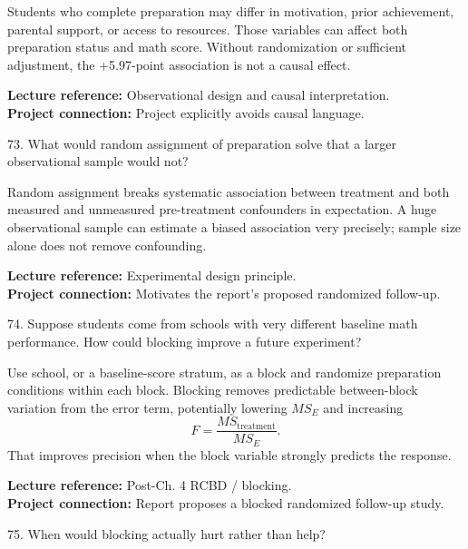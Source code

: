 \documentclass[10.5pt,a4paper]{article}
\newcommand{\chapref}[1]{\textbf{Lecture reference:} #1}
\newcommand{\projectref}[1]{\textbf{Project connection:} #1}
\begin{document}
\begin{answerbox}Students who complete preparation may differ in motivation, prior achievement, parental support, or access to resources. Those variables can affect both preparation status and math score. Without randomization or sufficient adjustment, the +5.97-point association is not a causal effect.\end{answerbox}
\begin{refbox}\chapref{Observational design and causal interpretation.}\\\projectref{Project explicitly avoids causal language.}\end{refbox}
\begin{qbox}{73. What would random assignment of preparation solve that a larger observational sample would not?}
\end{qbox}
\begin{answerbox}Random assignment breaks systematic association between treatment and both measured and unmeasured pre-treatment confounders in expectation. A huge observational sample can estimate a biased association very precisely; sample size alone does not remove confounding.\end{answerbox}
\begin{refbox}\chapref{Experimental design principle.}\\\projectref{Motivates the report's proposed randomized follow-up.}\end{refbox}
\begin{qbox}{74. Suppose students come from schools with very different baseline math performance. How could blocking improve a future experiment?}
\end{qbox}
\begin{answerbox}Use school, or a baseline-score stratum, as a block and randomize preparation conditions within each block. Blocking removes predictable between-block variation from the error term, potentially lowering \(MS_E\) and increasing
\[
F=\frac{MS_{\text{treatment}}}{MS_E}.
\]
That improves precision when the block variable strongly predicts the response.\end{answerbox}
\begin{refbox}\chapref{Post-Ch. 4 RCBD / blocking.}\\\projectref{Report proposes a blocked randomized follow-up study.}\end{refbox}
\begin{qbox}{75. When would blocking actually hurt rather than help?}
\end{qbox}
\end{document}
